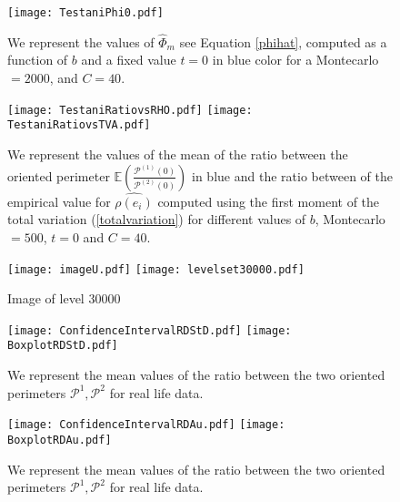 \documentclass[12pt]{article}
\renewcommand{\hat}{\widehat}
\theoremstyle{Theorem}
\theoremstyle{definition}
\begin{document}
\begin{figure}[H]
  \centering
    {\texttt{[image: TestaniPhi0.pdf]}}
    \hspace{0.2cm} 
 \caption{We represent the values of $\hat{\Phi}_{m}$ see Equation \eqref{phihat}, computed as a function of $b$ and a fixed value $t=0$ in blue color for a Montecarlo $= 2000$, and $C = 40$.}
\label{fig2}
\end{figure}

\begin{figure}[H]
  \centering
    {\texttt{[image: TestaniRatiovsRHO.pdf]}}
    {\texttt{[image: TestaniRatiovsTVA.pdf]}}
    \hspace{0.2cm} 
 \caption{We represent the values of the mean of the ratio between the oriented perimeter $\mathbb{E}\left(\frac{\mathcal{P}^{(1)}(0)}{\mathcal{P}^{(2)}(0)}\right)$ in blue and the ratio between of the empirical value for $\hat{\rho(e_i)}$ computed using the first moment of the total variation (\ref{totalvariation}) for different values of $b$, Montecarlo $= 500$, $t = 0$ and $C = 40$.}
\label{fig2}
\end{figure}


\begin{figure}[H]
  \centering
    {\texttt{[image: imageU.pdf]}}
    \hspace{3cm}
    {\texttt{[image: levelset30000.pdf]}}
    \hspace{0.2cm}
 \caption{ Image of level $30000$}
\label{fig2}
\end{figure}

\begin{figure}[H]
  \centering
    {\texttt{[image: ConfidenceIntervalRDStD.pdf]}}
    {\texttt{[image: BoxplotRDStD.pdf]}}
    \hspace{0.2cm}
 \caption{We represent the mean values of the ratio between the two oriented perimeters $\mathcal{P}^{1}, \mathcal{P}^{2}$ for real life data.}
\label{fig2}
\end{figure}


\begin{figure}[H]
  \centering
    {\texttt{[image: ConfidenceIntervalRDAu.pdf]}}
    {\texttt{[image: BoxplotRDAu.pdf]}}
    \hspace{0.2cm}
 \caption{We represent the mean values of the ratio between the two oriented perimeters $\mathcal{P}^{1}, \mathcal{P}^{2}$ for real life data.}
\label{fig2}
\end{figure}
\end{document}
